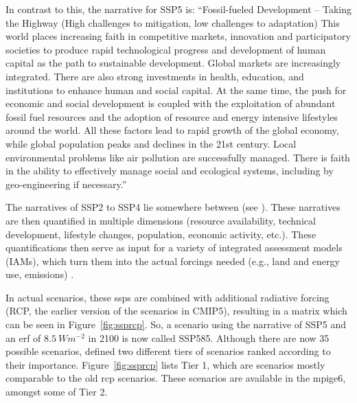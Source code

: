 In contrast to this, the narrative for SSP5 is: \enquote{Fossil-fueled Development – Taking the Highway (High challenges to mitigation, low challenges to adaptation) This world places increasing faith in competitive markets, innovation and participatory societies to produce rapid technological progress and development of human capital as the path to sustainable development. Global markets are increasingly integrated. There are also strong investments in health, education, and institutions to enhance human and social capital. At the same time, the push for economic and social development is coupled with the exploitation of abundant fossil fuel resources and the adoption of resource and energy intensive lifestyles around the world. All these factors lead to rapid growth of the global economy, while global population peaks and declines in the 21st century. Local environmental problems like air pollution are successfully managed. There is faith in the ability to effectively manage social and ecological systems, including by geo-engineering if necessary.} \cite{riahi_shared_2017}

The narratives of SSP2 to SSP4 lie somewhere between (see \cite{riahi_shared_2017}). 
These narratives are then quantified in multiple dimensions (resource availability, technical development, lifestyle changes, population, economic activity, etc.). 
These quantifications then serve as input for a variety of integrated assessment models (IAMs), which turn them into the actual forcings needed (e.g., land and energy use, emissions) \cite{riahi_shared_2017}. 

In actual scenarios, these \acp{ssp} are combined with additional radiative forcing (RCP, the earlier version of the scenarios in CMIP5), resulting in a matrix which can be seen in Figure~\ref{fig:ssprcp}. 
So, a scenario using the narrative of SSP5 and an \ac{erf} of $8.5~Wm^{-2}$ in 2100 is now called SSP585. 
Although there are now 35 possible scenarios, \citeauthor{oneill_scenario_2016} defined two different tiers of scenarios ranked according to their importance. 
Figure~\ref{fig:ssprcp} lists Tier 1, which are scenarios mostly comparable to the old \ac{rcp} scenarios. 
These scenarios are available in the \ac{mpige6}, amongst some of Tier 2. \cite{oneill_scenario_2016, riahi_shared_2017, bottinger_michael_ssp_nodate}

